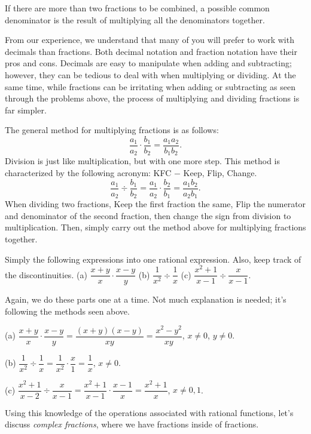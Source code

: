\documentclass[lang=en,11pt]{elegantbook}
\begin{document}
\begin{remark}
If there are more than two fractions to be combined, a possible common denominator is the result of multiplying all the denominators together.
\end{remark}
From our experience, we understand that many of you will prefer to work with decimals than fractions. Both decimal notation and fraction notation have their pros and cons. Decimals are easy to manipulate when adding and subtracting; however, they can be tedious to deal with when multiplying or dividing. At the same time, while fractions can be irritating when adding or subtracting as seen through the problems above, the process of multiplying and dividing fractions is far simpler.

The general method for multiplying fractions is as follows: $$\dfrac{a_1}{a_2}\cdot\dfrac{b_1}{b_2}=\dfrac{a_1a_2}{b_1b_2}.$$
Division is just like multiplication, but with one more step. This method is characterized by the following acronym: KFC $-$ Keep, Flip, Change. $$\dfrac{a_1}{a_2}\div\dfrac{b_1}{b_2}=\dfrac{a_1}{a_2}\cdot\dfrac{b_2}{b_1}=\dfrac{a_1b_2}{a_2b_1}.$$
When dividing two fractions, Keep the first fraction the same, Flip the numerator and denominator of the second fraction, then change the sign from division to multiplication. Then, simply carry out the method above for multiplying fractions together.
\begin{example}
Simply the following expressions into one rational expression. Also, keep track of the discontinuities.\newline
(a) $\dfrac{x+y}{x}\cdot \dfrac{x-y}{y}$  (b) $\dfrac{1}{x^2}\div\dfrac{1}{x}$  (c) $\dfrac{x^2+1}{x-1}\div\dfrac{x}{x-1}$.
\end{example}
\begin{solution}
Again, we do these parts one at a time.  Not much explanation is needed; it's following the methods seen above.

(a) $\dfrac{x+y}{x}\cdot\dfrac{x-y}{y}=\dfrac{(x+y)(x-y)}{xy}=\dfrac{x^2-y^2}{xy}$, $x\neq 0$, $y\neq 0$.

(b) $\dfrac{1}{x^2}\div\dfrac{1}{x}=\dfrac{1}{x^2}\cdot\dfrac{x}{1}=\dfrac{1}{x}$, $x\neq 0$.

(c) $\dfrac{x^2+1}{x-2}\div\dfrac{x}{x-1}=\dfrac{x^2+1}{x-1}\cdot\dfrac{x-1}{x}=\dfrac{x^2+1}{x}$, $x\neq 0,1$.
\end{solution}
Using this knowledge of the operations associated with rational functions, let's discuss \textit{complex fractions}, where we have fractions inside of fractions.
\end{document}
